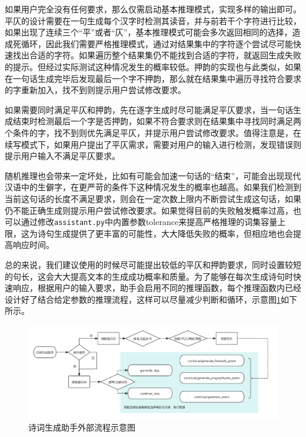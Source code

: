 如果用户完全没有任何要求，那么仅需启动基本推理模式，实现多样的输出即可。平仄的设计需要在一句生成每个汉字时检测其读音，并与前若干个字符进行比较，如果出现了连续三个“平”或者“仄”，基本推理模式可能会多次返回相同的选择，造成死循环，因此我们需要严格推理模式，通过对结果集中的字符逐个尝试尽可能快速找出合适的字符。如果遍历整个结果集仍不能找到合适的字符，就返回生成失败的提示。但经过实际测试这种情况发生的概率较低。押韵的实现也与此类似，如果在一句话生成完毕后发现最后一个字不押韵，那么就在结果集中遍历寻找符合要求的字重新加入，找不到则提示用户尝试修改要求。

如果需要同时满足平仄和押韵，先在逐字生成时尽可能满足平仄要求，当一句话生成结束时检测最后一个字是否押韵，如果不符合要求则在结果集中寻找同时满足两个条件的字，找不到则优先满足平仄，并提示用户尝试修改要求。值得注意是，在续写模式下，如果用户提出了平仄需求，需要对用户的输入进行检测，发现错误则提示用户输入不满足平仄要求。

随机推理也会带来一定坏处，比如有可能会加速一句话的“结束”，可能会出现现代汉语中的生僻字，在更严苛的条件下这种情况发生的概率也越高。如果我们检测到当前这句话的长度不满足要求，则会在一定次数上限内不断尝试生成这句话，如果仍不能正确生成则提示用户尝试修改要求。如果觉得目前的失败触发概率过高，也可以通过修改\texttt{assistant.py}中内置参数tolerance来提高严格推理的词集容量上限，这为诗句生成提供了更丰富的可能性，大大降低失败的概率，但相应地也会提高响应时间。

总的来说，我们建议使用的时候尽可能提出较低的平仄和押韵要求，同时设置较短的句长，这会大大提高文本的生成成功概率和质量。为了能够在每次生成诗句时快速响应，根据用户的输入要求，助手会启用不同的推理函数，每个推理函数内已经设计好了结合给定参数的推理流程，这样可以尽量减少判断和循环，示意图\ref{fig:iwslt-wmt3}如下所示。

\begin{figure}[h]
    \centering
    \includegraphics[width=\textwidth]{img/writer/诗词生成助手流程.png}
    \caption{诗词生成助手外部流程示意图}
    \label{fig:iwslt-wmt3}
\end{figure}

